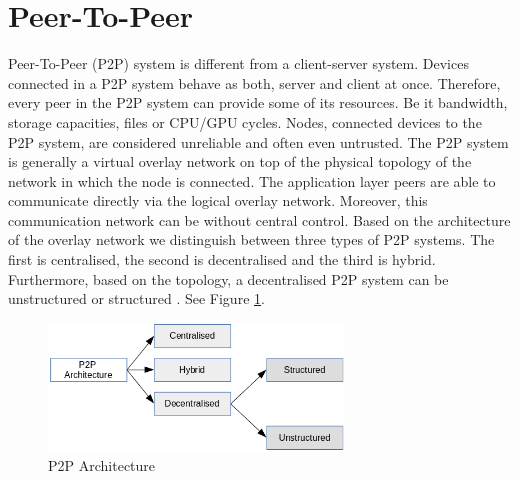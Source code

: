 \section{Peer-To-Peer}
\quad Peer-To-Peer (P2P) system is different from a client-server system. Devices connected in a P2P system behave as both, server and client at once. Therefore, every peer in the P2P system can provide some of its resources. Be it bandwidth, storage capacities, files or CPU/GPU cycles. Nodes, connected devices to the P2P system, are considered unreliable and often even untrusted. The P2P system is generally a virtual overlay network on top of the physical topology of the network in which the node is connected. The application layer peers are able to communicate directly via the logical overlay network. Moreover, this communication network can be without central control. Based on the architecture of the overlay network we distinguish between three types of P2P systems. The first is centralised, the second is decentralised and the third is hybrid. Furthermore, based on the topology, a decentralised P2P system can be unstructured or structured \cite{vu_peer--peer_2010}. See Figure \ref{fig:P2P-architecture}.

\begin{figure}[ht]
	\centering
	\includegraphics[width=0.7\textwidth]{images/p2p-architecture.png}
	\caption{\label{fig:P2P-architecture}P2P Architecture}
\end{figure}

